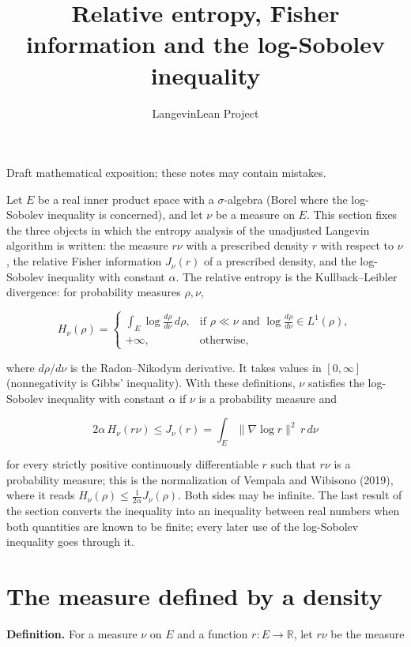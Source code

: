 \documentclass[11pt,a4paper]{article}
\title{\texorpdfstring{Relative entropy, Fisher information and the log-Sobolev inequality}{Relative entropy, Fisher information and the log-Sobolev inequality}}
\author{LangevinLean Project}
\date{}
\begin{document}
\maketitle
Draft mathematical exposition; these notes may contain mistakes.


Let \(E\) be a real inner product space with a \(\sigma\)-algebra (Borel where the log-Sobolev inequality is concerned), and let \(\nu\) be a measure on \(E\). This section fixes the three objects in which the entropy analysis of the unadjusted Langevin algorithm is written: the measure \(r\nu\) with a prescribed density \(r\) with respect to \(\nu\), the relative Fisher information \(J_\nu(r)\) of a prescribed density, and the log-Sobolev inequality with constant \(\alpha\). The relative entropy is the Kullback–Leibler divergence: for probability measures \(\rho,\nu\),


\[H_\nu(\rho)=\begin{cases}\displaystyle\int_E\log\frac{d\rho}{d\nu}\,d\rho, & \text{if }\rho\ll\nu\text{ and }\log\frac{d\rho}{d\nu}\in L^1(\rho),\\ +\infty, & \text{otherwise},\end{cases}\]


where \(d\rho/d\nu\) is the Radon–Nikodym derivative. It takes values in \([0,\infty]\) (nonnegativity is Gibbs' inequality). With these definitions, \(\nu\) satisfies the log-Sobolev inequality with constant \(\alpha\) if \(\nu\) is a probability measure and


\[2\alpha\,H_\nu(r\nu)\le J_\nu(r)=\int_E\|\nabla\log r\|^2\,r\,d\nu\]


for every strictly positive continuously differentiable \(r\) such that \(r\nu\) is a probability measure; this is the normalization of Vempala and Wibisono (2019), where it reads \(H_\nu(\rho)\le\frac1{2\alpha}J_\nu(\rho)\). Both sides may be infinite. The last result of the section converts the inequality into an inequality between real numbers when both quantities are known to be finite; every later use of the log-Sobolev inequality goes through it.


\section{\texorpdfstring{The measure defined by a density}{The measure defined by a density}}


\textbf{Definition.} For a measure \(\nu\) on \(E\) and a function \(r:E\to\mathbb R\), let \(r\nu\) be the measure
\end{document}
